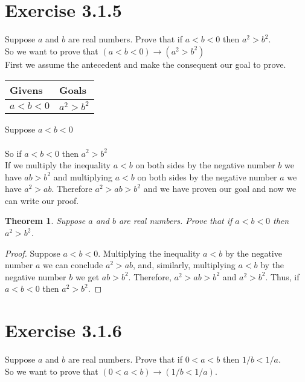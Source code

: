 \documentclass{article}
\newcommand{\n}{ \noindent }
\newtheorem*{theorem}{Theorem}  %
\begin{document}
\section*{Exercise 3.1.5}
Suppose $a$ and $b$ are real numbers. Prove that if $a<b<0$ then $a^2 > b^2$.\\

\n So we want to prove that 
$(a<b<0) \rightarrow (a^2 > b^2)$ \\

\n First we assume the antecedent and make the consequent our goal to prove.

\begin{table}[h]
\begin{tabular}{ll}
\hline
Givens & Goals   \\ \hline
$a<b<0$ & $a^2 > b^2$   \\ \hline
\end{tabular}
\end{table}

\n Suppose $a<b<0$ \\
\indent [proof of $a^2 > b^2$ ] \\
\n So if $a<b<0$ then $a^2 > b^2$ \\

\n If we multiply the inequality $a<b$ on both sides by the negative number $b$ we have $ab>b^2$ and multiplying $a<b$ on both sides by the negative number $a$ we have $a^2>ab$. Therefore $a^2 > ab > b^2$ and we have proven our goal and now we can write our proof.

\begin{theorem} Suppose $a$ and $b$  are real numbers. Prove that if $a<b<0$ then $a^2 > b^2$. 
\end{theorem}
\begin{proof}
Suppose $a<b<0$. Multiplying the inequality $a<b$ by the negative number $a$ we can conclude $a^2 > ab$, and, similarly, multiplying $a<b$ by the negative number $b$ we get $ab>b^2$. Therefore, $a^2>ab>b^2$ and $a^2>b^2$. Thus, if $a<b<0$ then $a^2>b^2$.
\end{proof}


\section*{Exercise 3.1.6}
Suppose $a$ and $b$ are real numbers. Prove that if $0<a<b$ then $1/b < 1/a$. \\

\n So we want to prove that 
$(0<a<b) \rightarrow (1/b < 1/a)$. \\
\end{document}
